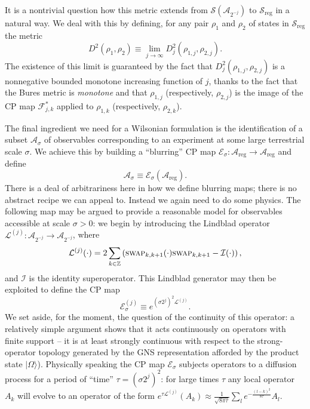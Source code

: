 \documentclass[11pt]{amsart}
\theoremstyle{plain}%
\theoremstyle{definition}
\theoremstyle{remark}
\begin{document}
It is a nontrivial question how this metric extends from $\mathcal{S}(\mathcal{A}_{2^{-j}})$ to $\mathcal{S}_{\text{reg}}$ in a natural way. We deal with this by defining, for any pair $\rho_1$ and $\rho_2$ of states in $\mathcal{S}_{\text{reg}}$ the metric
\begin{equation}
	D^2(\rho_1,\rho_2) \equiv \lim_{j\rightarrow\infty}  D^2_j(\rho_{1,j},\rho_{2,j}).
\end{equation}
The existence of this limit is guaranteed by the fact that $D^2_j(\rho_{1,j},\rho_{2,j})$ is a nonnegative bounded monotone increasing function of $j$, thanks to the fact that the Bures metric is \emph{monotone} and that $\rho_{1,j}$ (respectively, $\rho_{2,j}$) is the image of the CP map $\mathcal{F}_{j,k}^{*}$ applied to $\rho_{1,k}$ (respectively, $\rho_{2,k}$).



The final ingredient we need for a Wilsonian formulation is the identification of a subset $\mathcal{A}_\sigma$ of observables corresponding to an experiment at some large terrestrial scale $\sigma$. We achieve this by building a ``blurring'' CP map $\mathcal{E}_{\sigma}:\mathcal{A}_{\text{reg}}\rightarrow \mathcal{A}_{\text{reg}}$ and define 
\begin{equation}
	\mathcal{A}_\sigma \equiv \mathcal{E}_{\sigma}(\mathcal{A}_{\text{reg}}).
\end{equation}
There is a deal of arbitrariness here in how we define blurring maps; there is no abstract recipe we can appeal to. Instead we again need to do some physics. The following map may be argued to provide a reasonable model for observables accessible at scale $\sigma > 0$: we begin by introducing the Lindblad operator $\mathcal{L}^{(j)}:\mathcal{A}_{2^{-j}} \rightarrow \mathcal{A}_{2^{-j}}$, where
\begin{equation}
	\mathcal{L}^{(j)}(\cdot) = 2\sum_{k\in \mathbb{Z}} \left(\textsc{swap}_{k,k+1}(\cdot)\textsc{swap}_{k,k+1} - \mathcal{I}(\cdot)\right),
\end{equation}
and $\mathcal{I}$ is the identity superoperator. This Lindblad generator may then be exploited to define the CP map
\begin{equation}
	\mathcal{E}_\sigma^{(j)} \equiv e^{(\sigma 2^{j})^2\mathcal{L}^{(j)}}.
\end{equation} 
We set aside, for the moment, the question of the continuity of this operator: a relatively simple argument shows that it acts continuously on operators with finite support -- it is at least strongly continuous with respect to the strong-operator topology generated by the GNS representation afforded by the product state $|\Omega\rangle$). Physically speaking the CP map $\mathcal{E}_{\sigma}$ subjects operators to a diffusion process for a period of ``time'' $\tau = (\sigma 2^{j})^2$: for large times $\tau$ any local operator $A_k$ will evolve to an operator of the form $e^{\tau\mathcal{L}^{(j)}}(A_k) \approx \frac{1}{\sqrt{8\pi \tau}}\sum_l e^{-\frac{(l-k)^2}{8\tau}} A_l$.
\end{document}
